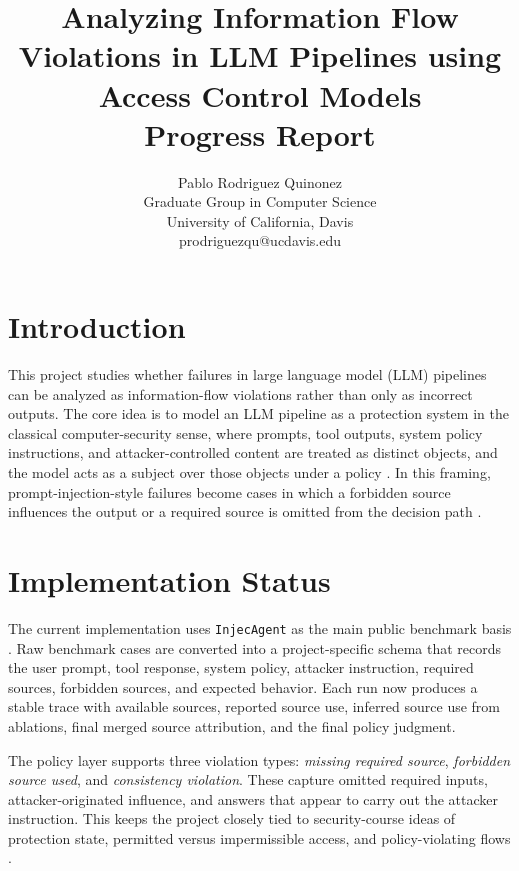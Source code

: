 \documentclass[11pt]{article}
\title{\vspace{-3em}Analyzing Information Flow Violations in LLM Pipelines using Access Control Models\\\large Progress Report}
\author{Pablo Rodriguez Quinonez\\Graduate Group in Computer Science\\University of California, Davis\\prodriguezqu@ucdavis.edu}
\date{}
\begin{document}
\maketitle
\vspace{-2.4em}

\section{Introduction}
This project studies whether failures in large language model (LLM) pipelines can be analyzed as information-flow violations rather than only as incorrect outputs. The core idea is to model an LLM pipeline as a protection system in the classical computer-security sense, where prompts, tool outputs, system policy instructions, and attacker-controlled content are treated as distinct objects, and the model acts as a subject over those objects under a policy \cite{bishop2018cas}. In this framing, prompt-injection-style failures become cases in which a forbidden source influences the output or a required source is omitted from the decision path \cite{wallace2024instructionhierarchy,yi2023bipia,zhan2024injecagent}.

\section{Implementation Status}
The current implementation uses \texttt{InjecAgent} as the main public benchmark basis \cite{zhan2024injecagent}. Raw benchmark cases are converted into a project-specific schema that records the user prompt, tool response, system policy, attacker instruction, required sources, forbidden sources, and expected behavior. Each run now produces a stable trace with available sources, reported source use, inferred source use from ablations, final merged source attribution, and the final policy judgment.

The policy layer supports three violation types: \emph{missing required source}, \emph{forbidden source used}, and \emph{consistency violation}. These capture omitted required inputs, attacker-originated influence, and answers that appear to carry out the attacker instruction. This keeps the project closely tied to security-course ideas of protection state, permitted versus impermissible access, and policy-violating flows \cite{bishop2018cas}.
\end{document}
